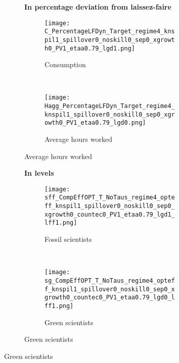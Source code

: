 \begin{figure}[h!!!]
	\centering 	\caption{Efficient and optimal allocation: no knowledge spillovers}\label{fig:optAll_percLf_dyn_noKN}
		\begin{subfigure}[]{1\textwidth}	
		\centering\footnotesize{\textbf{In percentage deviation from laissez-faire}}\\ \vspace{2mm}
		\begin{subfigure}[]{0.4\textwidth}
			\caption{Consumption}
			\texttt{[image: C\_PercentageLFDyn\_Target\_regime4\_knspil1\_spillover0\_noskill0\_sep0\_xgrowth0\_PV1\_etaa0.79\_lgd1.png]}
		\end{subfigure}
		\begin{minipage}[]{0.1\textwidth}
			\ 
		\end{minipage}
		\begin{subfigure}[]{0.4\textwidth}
			\caption{Average hours worked }
			\texttt{[image: Hagg\_PercentageLFDyn\_Target\_regime4\_knspil1\_spillover0\_noskill0\_sep0\_xgrowth0\_PV1\_etaa0.79\_lgd0.png]}
		\end{subfigure}
	\end{subfigure}
	
	\vspace{3mm}
			\begin{subfigure}[]{1\textwidth}	
		\centering\footnotesize{\textbf{In levels}}\\ \vspace{2mm}
\begin{subfigure}[]{0.4\textwidth}
	\caption{Fossil scientists}
	\texttt{[image: sff\_CompEffOPT\_T\_NoTaus\_regime4\_opteff\_knspil1\_spillover0\_noskill0\_sep0\_xgrowth0\_countec0\_PV1\_etaa0.79\_lgd1\_lff1.png]}
\end{subfigure}
	\begin{minipage}[]{0.1\textwidth}
		\ 
	\end{minipage}
	\begin{subfigure}[]{0.4\textwidth}
		\caption{Green scientists}
		\texttt{[image: sg\_CompEffOPT\_T\_NoTaus\_regime4\_opteff\_knspil1\_spillover0\_noskill0\_sep0\_xgrowth0\_countec0\_PV1\_etaa0.79\_lgd0\_lff1.png]}
	\end{subfigure}	
\end{subfigure}
\end{figure} 


